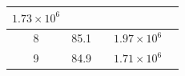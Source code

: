 \documentclass[UTF8,10pt,a4paper,fontset=fandol]{ctexart}
\newcommand{\fieldvalue}[1]{#1}
\newcommand{\handwritten}[1]{#1}
\begin{document}
\begin{center}
\begin{center}
\begin{tabularx}{\textwidth}{|c|X|X|X|X|}
\fieldvalue{\handwritten{$1.73\times10^{6}$}} & \\
\hline
8 &
\fieldvalue{\handwritten{85.1}} &
&
\fieldvalue{\handwritten{$1.97\times10^{6}$}} & \\
\hline
9 &
\fieldvalue{\handwritten{84.9}} &
&
\fieldvalue{\handwritten{$1.71\times10^{6}$}} & \\
\hline
\end{tabularx}
\normalsize


\end{center}
\end{center}
\end{document}
